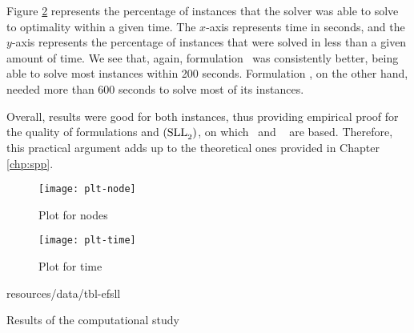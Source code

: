 Figure \ref{fig:plt-time} represents the percentage of instances that the solver
was able to solve to optimality within a given time. The $x$-axis represents
time in seconds, and the $y$-axis represents the percentage of instances that
were solved in less than a given amount of time. We see that, again, formulation
\efsllb~was consistently better, being able to solve most instances within 200
seconds. Formulation \efslla, on the other hand, needed more than 600 seconds to
solve most of its instances.

Overall, results were good for both instances, thus providing empirical proof
for the quality of formulations \slla and $\rm{(SLL}_2\rm{)}$, on which
\efslla~and \efsllb~ are based. Therefore, this practical argument adds up to
the theoretical ones provided in Chapter \ref{chp:spp}.

\begin{figure}
    \centering
    \texttt{[image: plt-node]}
    \caption{Plot for nodes}
    \label  {fig:plt-node}
\end{figure}

\begin{figure}
    \centering
    \texttt{[image: plt-time]}
    \caption{Plot for time}
    \label  {fig:plt-time}
\end{figure}

\begin{table}
    \centering
      {resources/data/tbl-efsll}
    \caption{Results of the computational study}
    \label  {tbl:efsll}
\end{table}
